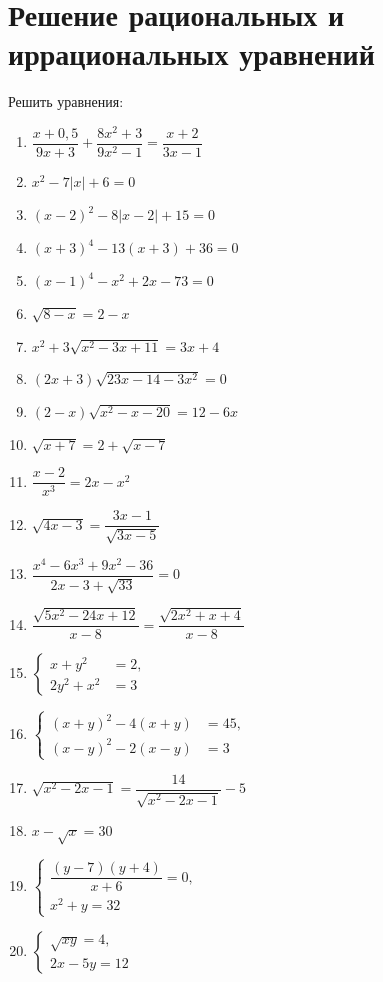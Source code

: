 \documentclass[12pt, a4paper]{article}
\begin{document}
		

\section*{Решение рациональных и иррациональных уравнений}
Решить уравнения:
\begin{multicols}{2}
	\begin{enumerate}
		\item $\dfrac{x+0,5}{9x+3}+\dfrac{8x^2+3}{9x^2-1}=\dfrac{x+2}{3x-1}$
		\item $x^2-7|x|+6=0$
		\item $(x-2)^2-8|x-2|+15=0$
		\item $(x+3)^4-13(x+3)+36=0$
		\item $(x-1)^4-x^2+2x-73=0$
		\item $\sqrt{8-x}=2-x$
		\item $x^2+3\sqrt{x^2-3x+11}=3x+4$
		\item $(2x+3)\sqrt{23x-14-3x^2}=0$
		\item $(2-x)\sqrt{x^2-x-20}=12-6x$
		\item $\sqrt{x+7}=2+\sqrt{x-7}$
		\item $\dfrac{x-2}{x^3}=2x-x^2$
		\item $\sqrt{4x-3}=\dfrac{3x-1}{\sqrt{3x-5}}$
		\item $\dfrac{x^4-6x^3+9x^2-36}{2x-3+\sqrt{33}}=0$
		\item $\dfrac{\sqrt{5x^2-24x+12}}{x-8}=\dfrac{\sqrt{2x^2+x+4}}{x-8}$
		\item $\left\{
		\begin{aligned}
			x+y^2&=2,\\
			2y^2+x^2&=3
		\end{aligned}
		\right.$
		\item $\left\{
		\begin{aligned}
			(x+y)^2-4(x+y)&=45,\\
			(x-y)^2-2(x-y)&=3
		\end{aligned}
		\right.$
		\item $\sqrt{x^2-2x-1}=\dfrac{14}{\sqrt{x^2-2x-1}}-5$
		\item $x-\sqrt{x}=30$
		\item $\left\{
		\begin{aligned}
			\dfrac{(y-7)(y+4)}{x+6}=0,\\
			x^2+y=32
		\end{aligned}
		\right.$
		\item $\left\{
		\begin{aligned}
			\sqrt{xy}=4,\\
			2x-5y=12
		\end{aligned}
		\right.$
	\end{enumerate}
\end{multicols}
\end{document}
